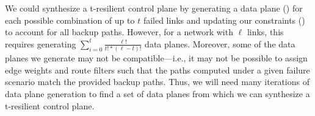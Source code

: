 
We could synthesize a t-resilient control plane by generating a data plane
() for each possible combination of up to $t$
failed links and updating our constraints () to account
for all backup paths. However, for a network with $\ell$ links, this requires
generating $\sum_{i=0}^{t} \frac{\ell!}{t! * (\ell-t)!}$ data planes.
Moreover, some of the data planes we generate may not be compatible---i.e., it
may not be possible to assign edge weights and route filters such that the
paths computed under a given failure scenario match the provided backup paths.
Thus, we will need many iterations of data plane generation to find a set of
data planes from which we can synthesize a t-resilient control plane.


